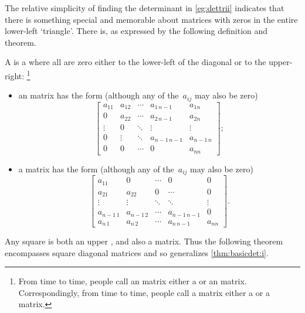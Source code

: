 The relative simplicity of finding the determinant in \cref{eg:dettrii} indicates that there is something special and memorable about matrices with zeros in the entire lower-left `triangle'.
There is, as expressed by the following definition and theorem.






\begin{definition} \label{def:trim}
A  is a  where all  are zero either to the lower-left of the diagonal or to the upper-right:%
\footnote{From time to time, people call an  matrix either a  or an  matrix.  
Correspondingly, from time to time, people  call a  matrix either a  or a  matrix.}
\begin{itemize}
\item an  matrix has the form (although any of the~\(a_{ij}\) may also be zero)
\begin{equation*}
\begin{bmatrix} a_{11}&a_{12}&\cdots&a_{1\,n-1}&a_{1n}
\\0&a_{22}&\cdots&a_{2\,n-1} &a_{2n}
\\\vdots&0&\ddots&\vdots&\vdots
\\0&\vdots&\ddots&a_{n-1\,n-1}&a_{n-1\,n} 
\\0&0&\cdots&0&a_{nn} \end{bmatrix};
\end{equation*}

\item a  matrix has the form (although any of the~\(a_{ij}\) may also be zero)
\begin{equation*}
\begin{bmatrix} a_{11}&0&\cdots&0&0
\\a_{21}&a_{22}&0&\cdots &0
\\\vdots&\vdots&\ddots&\ddots&\vdots
\\a_{n-1\,1}&a_{n-1\,2}&\cdots&a_{n-1\,n-1}&0 
\\a_{n\,1}&a_{n\,2}&\cdots&a_{n\,n-1}&a_{nn} \end{bmatrix}.
\end{equation*}
\end{itemize}
\end{definition}


Any square  is both an upper , and also a  matrix.
Thus the following theorem encompasses square diagonal matrices and so generalizes \cref{thm:basicdet:i}.




